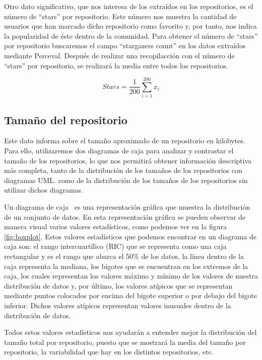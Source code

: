 \documentclass[a4paper, 12pt]{book}
\begin{document}
Otro dato significativo, que nos interesa de los extraídos en los repositorios, es el número de ``stars'' por repositorio.
Este número nos muestra la cantidad de usuarios que han marcado dicho repositorio como favorito y, por tanto, nos indica la popularidad de éste dentro de la comunidad. 
Para obtener el número de ``stars'' por repositorio buscaremos el campo ``stargazers count'' en los datos extraídos mediante Perceval. 
Después de realizar una recopilacción con el número de ``stars'' por repositorio, se realizará la media entre todos los repositorios.

\[{Stars} = \frac{1}{200} \sum_{i=1}^{200} x_i\]


\subsection{Tamaño del repositorio} %
\label{sec:tamaño del repositorio}
Este dato informa sobre el tamaño aproximado de un repositorio en kilobytes. 
Para ello, utilizaremos dos diagramas de caja para analizar y contrastar el tamaño de los repositorios, lo que nos permitirá obtener información descriptiva más completa, tanto de la distribución de los tamaños de los repositorios con diagramas UML. como de la distribución de los tamaños de los repositorios sin utilizar dichos diagramas.


Un diagrama de caja~\cite{neto2017boxplot} es una representación gráfica que muestra la distribución de un conjunto de datos.
En esta representación gráfica se pueden observar de manera visual varios valores estadísticos, como podemos ver en la figura \ref{fig:boxplot}.
Estos valores estadísticos que podemos encontrar en un diagrama de caja son: el rango intercuartílico (RIC) que se representa como una caja rectangular y es el rango que abarca el 50\% de los datos, la línea dentro de la caja representa la mediana, 
los bigotes que se encuentran en los extremos de la caja, los cuales representan los valores máximo y mínimo de los valores de nuestra distribución de datos y, por último, los valores atípicos que se representan mediante puntos colocados por encima del bigote superior o por debajo del bigote inferior.
Dichos valores atípicos representan valores inusuales dentro de la distribución de datos.


Todos estos valores estadísticos nos ayudarán a entender mejor la distribución del tamaño total por repositorio, puesto que se mostrará la media del tamaño por repositorio, la variabilidad que hay en los distintos repositorios, etc.
\end{document}
